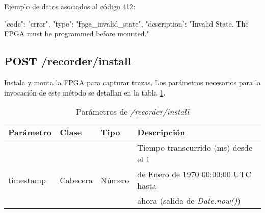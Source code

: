 \begin{itemize}
{\begin{minipage}{\textwidth}
Ejemplo de datos asociados al código 412:

\begin{code}[language=json]
{
  "code": "error",
  "type": "fpga_invalid_state",
  "description": "Invalid State. The FPGA must be programmed before mounted."
}
\end{code}
\end{minipage}
}

\end{itemize}

%
%
\subsection{POST /recorder/install}
Instala y monta la \gls{FPGA} para capturar \glspl{traza}. Los parámetros necesarios para la invocación de este método se detallan en la tabla \ref{extra:api:recorderinstall:invocacion}.

\begin{table}[H]
\centering
\begin{tabular}{|l|l|l|l|}
\hline
\rowcolor[HTML]{F5F5F5}
\textbf{Parámetro}  & \textbf{Clase} & \textbf{Tipo} & \textbf{Descripción}                  \\ \hline
                    &                &               & Tiempo transcurrido (ms) desde el 1   \\
timestamp           & Cabecera       & Número        & de Enero de 1970 00:00:00 UTC hasta   \\
                    &                &               & ahora (salida de \textit{Date.now()}) \\ \hline
\end{tabular}
\caption{Parámetros de \textit{/recorder/install}}
\label{extra:api:recorderinstall:invocacion}
\end{table}

